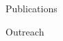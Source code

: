 \begin{small}
\begin{cvlist}{Publications}
\begin{itemize}
	\end{itemize}
\end{cvlist}

\begin{cvlist}{Outreach}
\item
	

\end{cvlist}
\end{small}
